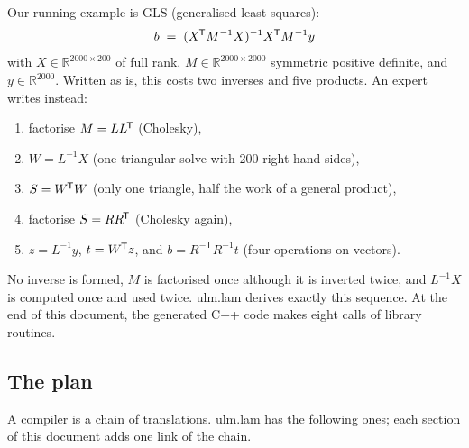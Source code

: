 \documentclass[11pt,a4paper]{article}
\newcommand{\T}{^{\mkern-1.5mu\mathsf{T}}}
\newcommand{\inv}{^{-1}}
\newcommand{\invT}{^{-\mathsf{T}}}
\let\origtexttt\texttt
\renewcommand{\texttt}[1]{\highLight[ttbg]{\origtexttt{#1}}}
\begin{document}
Our running example is GLS (generalised least squares):
\[
  b \;=\; (X\T M\inv X)\inv X\T M\inv y
\]
with \(X\in\mathbb{R}^{2000\times200}\) of full rank,
\(M\in\mathbb{R}^{2000\times2000}\) symmetric positive definite, and
\(y\in\mathbb{R}^{2000}\).
Written as is, this costs two inverses and five products. An expert writes
instead:
\begin{enumerate}
\item factorise \(M=LL\T\) (Cholesky),
\item \(W=L\inv X\) (one triangular solve with 200 right-hand sides),
\item \(S=W\T W\) (only one triangle, half the work of a general product),
\item factorise \(S=RR\T\) (Cholesky again),
\item \(z=L\inv y\), \(t=W\T z\), and \(b=R\invT R\inv t\) (four
  operations on vectors).
\end{enumerate}
No inverse is formed, \(M\) is factorised once although it is inverted
twice, and \(L\inv X\) is computed once and used twice. ulm.lam derives
exactly this sequence. At the end of this document, the generated C++ code
makes eight calls of library routines.

\subsection*{The plan}

A compiler is a chain of translations. ulm.lam has the following ones; each
section of this document adds one link of the chain.

\begin{center}
\end{center}
\end{document}
